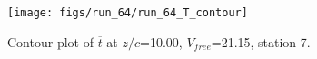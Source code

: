 \begin{figure}[H]
\centering
\texttt{[image: figs/run\_64/run\_64\_T\_contour]}
\caption{Contour plot of $\overline{t}$ at $z/c$=10.00, $V_{free}$=21.15, station 7.}
\label{fig:run_64_T_contour}
\end{figure}


